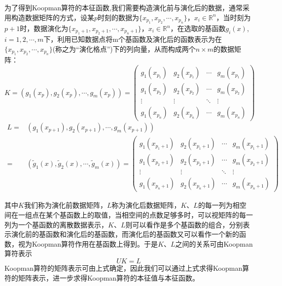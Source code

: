 为了得到Koopman算符的本征函数,我们需要构造演化前与演化后的数据，通常采用构造数据矩阵的方式，设某$p$时刻的数据为$\{x_{p_1},x_{p_2},\cdots,x_{p_n}\}$，$x_i\in \mathbb{R}^n$，当时刻为$p+1$时，数据演化为$\{x_{p_1+1},x_{p_2+1},\cdots,x_{p_n+1}\}$，$x_i\in \mathbb{R}^n$，在选取的基函数${g_i(x)}$,$i=1,2,\cdots,m$下，利用已知数据点将m个基函数及演化后的函数表示为在$\{x_{p_1},x_{p_2},\cdots,x_{p_n}\}$(称之为“演化格点”)下的列向量，从而构成两个$n\times m$的数据矩阵：
\begin{equation}
        K=(g_1(x_p),g_2(x_p),\cdots,g_m(x_p))=
        \begin{pmatrix}
        g_1(x_{p_1}) & g_2(x_{p_1}) & \cdots & g_m(x_{p_1}) \\
        g_1(x_{p_2}) & g_2(x_{p_2}) & \cdots & g_m(x_{p_2}) \\
        \vdots       & \vdots       & \ddots & \vdots \\
        g_1(x_{p_n}) & g_2(x_{p_n}) & \cdots & g_m(x_{p_n})
        \end{pmatrix}
\end{equation}
\begin{equation}
    \begin{aligned}
    L=&(g_1(x_{p+1}),g_2(x_{p+1}),\cdots,g_m(x_{p+1}))\\
    =&(\tilde{g}_1(x),\tilde{g}_2(x),\cdots,\tilde{g}_m(x))=
        \begin{pmatrix}
        g_1(x_{p_1+1}) & g_2(x_{p_1+1}) & \cdots & g_m(x_{p_1+1}) \\
        g_1(x_{p_2+1}) & g_2(x_{p_2+1}) & \cdots & g_m(x_{p_2+1}) \\
        \vdots         & \vdots         & \ddots & \vdots \\
        g_1(x_{p_n+1}) & g_2(x_{p_n+1}) & \cdots & g_m(x_{p_n+1})
        \end{pmatrix}
    \end{aligned}
\end{equation}

其中$K$我们称为演化前数据矩阵，$L$称为演化后数据矩阵，$K$、$L$的每一列为相空间在一组点在某个基函数上的取值，当相空间的点数足够多时，可以视矩阵的每一列为一个基函数的离散数据表示，$K$、$L$则可以看作是多个基函数的组合，分别表示演化前的基函数和演化后的基函数，而演化后的基函数又可以看作一个新的函数，视为Koopman算符作用在基函数上得到。于是$K$、$L$之间的关系可由Koopman算符表示
\begin{equation}
    UK=L
\end{equation}
Koopman算符的矩阵表示可由上式确定，因此我们可以通过上式求得Koopman算符的矩阵表示，进一步求得Koopman算符的本征值与本征函数。

